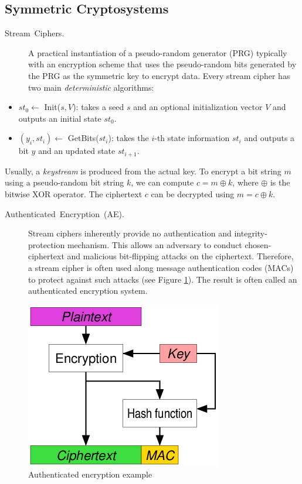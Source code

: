 \documentclass[10pt]{article}
\theoremstyle{plain}
\begin{document}
\subsection{Symmetric Cryptosystems}
\begin{description}
	\item [{Stream~Ciphers.}] A practical instantiation of a pseudo-random
	generator (PRG) typically with an encryption scheme that uses the
	pseudo-random bits generated by the PRG as the symmetric key to encrypt
	data. Every stream cipher has two main \emph{deterministic} algorithms:
\end{description}
\begin{itemize}
	\item $st_{0}\gets$ Init($s,V$): takes a seed $s$ and an optional initialization
	vector $V$ and outputs an initial state $st_{0}$.
	\item $(y_{i},st_{i})\gets$ GetBits($st_{i}$): takes the $i$-th state
	information $st_{i}$ and outputs a bit $y$ and an updated state
	$st_{i+1}$. 
\end{itemize}
Usually, a \emph{keystream }is produced from the actual key. To encrypt
a bit string $m$ using a pseudo-random bit string $k$, we can compute
$c=m\oplus k$, where $\oplus$ is the bitwise XOR operator. The ciphertext
$c$ can be decrypted using $m=c\oplus k$. 
\begin{description}
	\item [{Authenticated~Encryption~(AE).}] Stream ciphers inherently provide
	no authentication and integrity-protection mechanism. This allows
	an adversary to conduct chosen-ciphertext and malicious bit-flipping
	attacks on the ciphertext. Therefore, a stream cipher is often used
	along message authentication codes (MACs) to protect against such
	attacks (see Figure \ref{fig:ae}). The result is often called an
	authenticated encryption system.
\end{description}
\begin{figure}
	\begin{centering}
		\includegraphics[scale=0.7]{ae}
		\par\end{centering}
	\caption{Authenticated encryption example}
	\label{fig:ae}
\end{figure}
\end{document}
